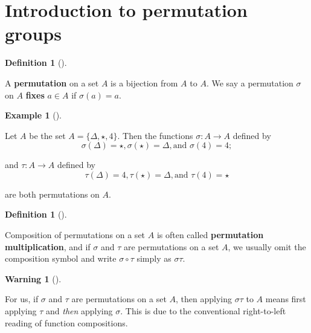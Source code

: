 \documentclass[10pt,]{book}
\newcommand{\terminology}[1]{\textbf{#1}}
\theoremstyle{plain}
\theoremstyle{definition}
\newtheorem{definition}[theorem]{Definition}
\theoremstyle{definition}
\newtheorem{warning}[theorem]{Warning}
\theoremstyle{definition}
\newtheorem{example}[theorem]{Example}
\theoremstyle{definition}
\numberwithin{equation}{section}
\begin{document}
\section[{Introduction to permutation groups}]{Introduction to permutation groups}\label{section-17}
\begin{definition}[{}]\label{definition-40}

        A \terminology{permutation} on a set \(A\) is a bijection from \(A\)
        to \(A\). We say a permutation \(\sigma\) on \(A\) \terminology{fixes} \(a\in
        A\) if \(\sigma(a)=a\).
\end{definition}
\begin{example}[]\label{stperm}

        Let \(A\) be the set \(A=\{\Delta, \star, 4\}\). Then the functions \(\sigma : A\to A\) defined by
\begin{equation*}

          \sigma(\Delta)=\star,
          \sigma(\star)=\Delta,  \text{and }  \sigma(4)=4;
        
\end{equation*}

        and \(\tau : A\to A\) defined by
\begin{equation*}

          \tau(\Delta)=4, 
          \tau(\star)=\Delta,  \text{and }  \tau(4)=\star
        
\end{equation*}

        are
        both permutations on \(A\).
\end{example}
\begin{definition}[{}]\label{definition-41}

        Composition of permutations on a set \(A\) is often called
        \terminology{permutation multiplication}, and if \(\sigma\) and \(\tau\)
        are permutations on a set \(A\), we usually omit the composition
        symbol and write \(\sigma \circ \tau\) simply as \(\sigma \tau\).
\end{definition}
\begin{warning}[]\label{warning-16}

      For us, if \(\sigma\) and \(\tau\) are permutations on a set \(A\), then applying \(\sigma \tau\) to \(A\) means first applying \(\tau\) and \emph{then} applying \(\sigma\). This is due to the conventional right-to-left reading of function compositions.
\end{warning}
\end{document}
